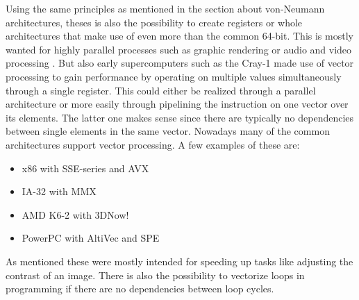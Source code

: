 Using the same principles as mentioned in the section about von-Neumann architectures, theses is also the possibility to create registers or whole architectures that make use of even more than the common 64-bit.
This is mostly wanted for highly parallel processes such as graphic rendering or audio and video processing .
But also early supercomputers such as the Cray-1  made use of vector processing to gain performance by operating on multiple values  simultaneously through a single register.
This could either be realized through a parallel architecture or more easily through pipelining the instruction on one vector over its elements.
The latter one makes sense since there are typically no dependencies between single elements in the same vector.
Nowadays many of the common architectures support vector processing.
A few examples of these are:
\begin{itemize}
    \item x86 with SSE-series and AVX
    \item IA-32 with MMX
    \item AMD K6-2 with 3DNow!
    \item PowerPC with AltiVec and SPE
\end{itemize}
As mentioned these were mostly intended for speeding up tasks like adjusting the contrast of an image.
There is also the possibility to vectorize loops in programming if there are no dependencies between loop cycles.
    

